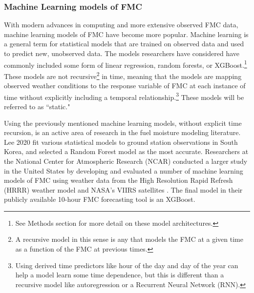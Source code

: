 \documentclass[11pt]{article}%
\begin{document}
\subsubsection{Machine Learning models of FMC}

With modern advances in computing and more extensive observed FMC data, machine learning models of FMC have become more popular. Machine learning is a general term for statistical models that are trained on observed data and used to predict new, unobserved data. The models researchers have considered have commonly included some form of linear regression, random forests, or XGBoost.\footnote{See Methods section for more detail on these model architectures.} These models are not recursive\footnote{A recursive model in this sense is any that models the FMC at a given time as a function of the FMC at previous times.} in time, meaning that the models are mapping observed weather conditions to the response variable of FMC at each instance of time without explicitly including a temporal relationship.\footnote{Using derived time predictors like hour of the day and day of the year can help a model learn some time dependence, but this is different than a recursive model like autoregression or a Recurrent Neural Network (RNN).} These models will be referred to as ``static."

Using the previously mentioned machine learning models, without explicit time recursion, is an active area of research in the fuel moisture modeling literature. Lee 2020 fit various statistical models to ground station observations in South Korea, and selected a Random Forest model as the most accurate. \cite{Lee-2020-EFM} Researchers at the National Center for Atmospheric Research (NCAR) conducted a larger study in the United States by developing and evaluated a number of machine learning models of FMC using weather data from the High Resolution Rapid Refresh (HRRR) weather model and NASA's VIIRS satellites \cite{McCandless-2020-EWS, Schreck-2023-MLV}. The final model in their publicly available 10-hour FMC forecasting tool is an XGBoost. 
\end{document}
